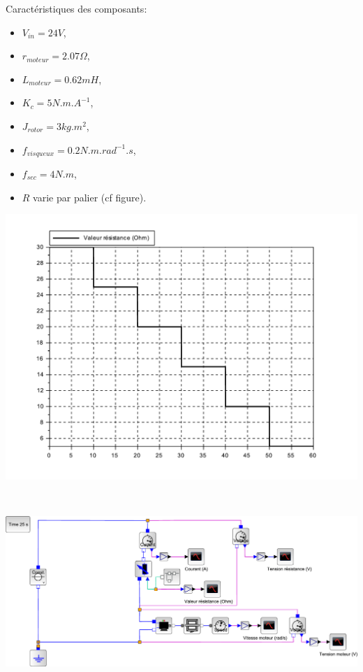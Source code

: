 \begin{minipage}{0.4\linewidth}
Caractéristiques des composants:
\begin{itemize}
 \item $V_{in}=24V$,
 \item $r_{moteur}=2.07\Omega$,
 \item $L_{moteur}=0.62mH$,
 \item $K_c=5N.m.A^{-1}$,
 \item $J_{rotor}=3kg.m^2$,
 \item $f_{visqueux}=0.2N.m.rad^{-1}.s$,
 \item $f_{sec}=4N.m$,
 \item $R$ varie par palier (cf figure).
\end{itemize}
\end{minipage}
 \hfill
\begin{minipage}{0.59\linewidth}
	\begin{center}
	\includegraphics[width=0.8\linewidth]{img/Valeur_resistance}
	\end{center}
\end{minipage}

~\

\begin{center}
\includegraphics[width=0.9\linewidth]{img/Rheostat_capteurs_xcos}
\end{center}


